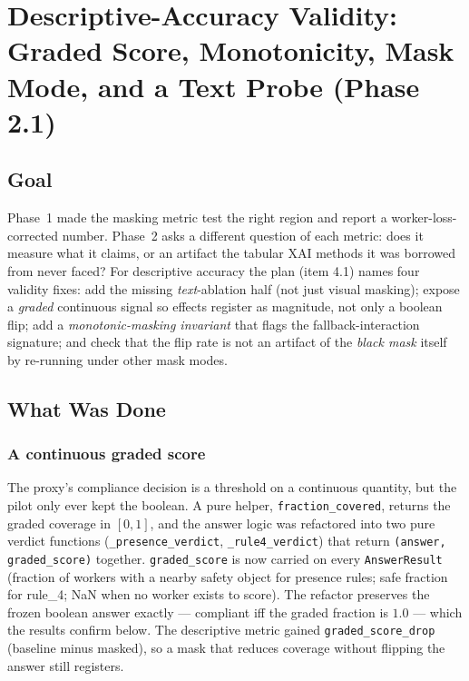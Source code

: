 \chapter{Descriptive-Accuracy Validity: Graded Score, Monotonicity, Mask Mode, and a Text Probe (Phase 2.1)}
\label{chap:p2-1}

\section{Goal}

Phase~1 made the masking metric test the right region and report a worker-loss-corrected number. Phase~2
asks a different question of each metric: does it measure what it claims, or an artifact the tabular
XAI methods it was borrowed from never faced? For descriptive accuracy the plan (item 4.1) names four
validity fixes: add the missing \emph{text}-ablation half (not just visual masking); expose a
\emph{graded} continuous signal so effects register as magnitude, not only a boolean flip; add a
\emph{monotonic-masking invariant} that flags the fallback-interaction signature; and check that the
flip rate is not an artifact of the \emph{black mask} itself by re-running under other mask modes.

\section{What Was Done}

\subsection{A continuous graded score}

The proxy's compliance decision is a threshold on a continuous quantity, but the pilot only ever kept
the boolean. A pure helper, \texttt{fraction\_covered}, returns the graded coverage in $[0,1]$, and the
answer logic was refactored into two pure verdict functions (\texttt{\_presence\_verdict},
\texttt{\_rule4\_verdict}) that return \texttt{(answer, graded\_score)} together. \texttt{graded\_score}
is now carried on every \texttt{AnswerResult} (fraction of workers with a nearby safety object for
presence rules; safe fraction for rule\_4; NaN when no worker exists to score). The refactor preserves
the frozen boolean answer exactly --- compliant iff the graded fraction is $1.0$ --- which the results
confirm below. The descriptive metric gained \texttt{graded\_score\_drop} (baseline minus masked), so a
mask that reduces coverage without flipping the answer still registers.

